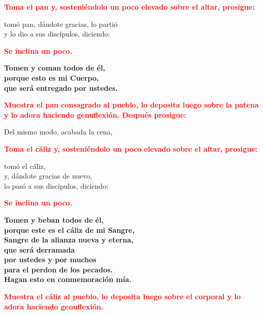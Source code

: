 \documentclass[12pt, letterpaper]{report}
\begin{document}
\large{\bfseries \textcolor{red}{Toma el pan y, sosteni\'endolo un poco elevado sobre el altar, prosigue:}}\newline

\Large tom\'o pan, d\'andote gracias, lo parti\'o\\
y lo dio a sus disc\'ipulos, diciendo:\newline

\large{\bfseries \textcolor{red}{Se inclina un poco.}} \newline

\LARGE{ \bfseries{ Tomen y coman todos de \'el,\\
porque esto es mi Cuerpo,\\
que ser\'a entregado por ustedes.}}\newline

\large{\bfseries \textcolor{red}{Muestra el pan consagrado al pueblo, lo deposita luego sobre la patena y lo adora haciendo genuflexi\'on. Despu\'es prosigue:}}\newline

\Large Del mismo modo, acabada la cena,\newline

\large{\bfseries \textcolor{red}{Toma el c\'aliz y, sosteni\'endolo un poco elevado sobre el altar, prosigue:}}\newline

\Large tom\'o el c\'aliz,\\
y, d\'andote gracias de nuevo,\\
lo pas\'o a sus disc\'ipulos, diciendo:\newline

\large{\bfseries \textcolor{red}{Se inclina un poco.}}\newline

\LARGE{ \bfseries{ Tomen y beban todos de \'el,\\
porque este es el c\'aliz de mi Sangre,\\
Sangre de la alianza nueva y eterna,\\
que ser\'a derramada\\
por ustedes y por muchos\\
para el perdon de los pecados.\\
Hagan esto en conmemoraci\'on m\'ia.}}\newline

\large{\bfseries \textcolor{red}{Muestra el c\'aliz al pueblo, lo deposita luego sobre el corporal y lo adora haciendo genuflexi\'on.}} \newline \\
\end{document}
